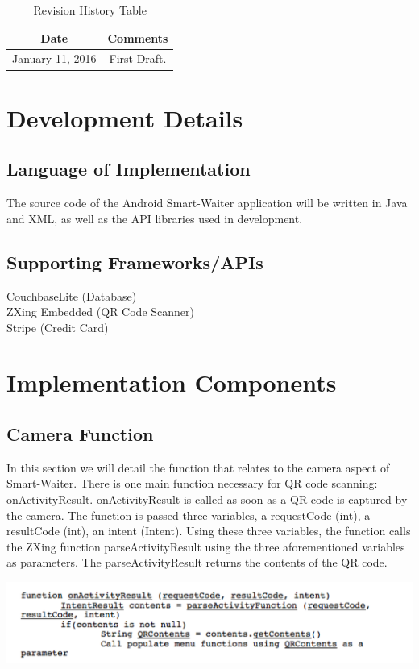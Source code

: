 \documentclass[12pt, titlepage]{article}
\begin{document}
\begin{table}[H]
\begin{tabular}{|c|c|}
\hline
\textbf{Date}  & \textbf{Comments} \\ \hline
January 11, 2016 &  First Draft. \\ 
\hline
\end{tabular}
\caption{Revision History Table}
\end{table}

\section{Development Details}
\subsection{Language of Implementation}
The source code of the Android Smart-Waiter application will be written in Java and XML, as well as the API libraries used in development. 

\subsection{Supporting Frameworks/APIs}
CouchbaseLite (Database)\\
ZXing Embedded (QR Code Scanner)\\
Stripe (Credit Card)

\section{Implementation Components}
\subsection{Camera Function}
In this section we will detail the function that relates to the camera aspect of Smart-Waiter. There is one main function necessary for QR code scanning: onActivityResult. onActivityResult is called as soon as a QR code is captured by the camera. The function is passed three variables, a requestCode (int), a resultCode (int), an intent (Intent). Using these three variables, the function calls the ZXing function parseActivityResult using the three aforementioned variables as parameters. The parseActivityResult returns the contents of the QR code. 
 
\includegraphics[width=150mm,scale=0.5]{camera.png}
\end{document}
